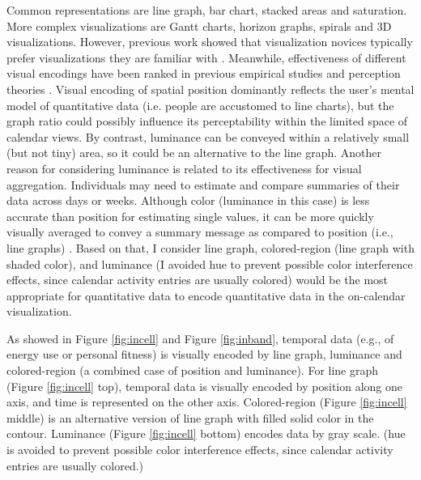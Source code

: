 \documentclass[12pt,oneside]{book}
\begin{document}
Common representations are line graph, bar chart, stacked areas and saturation.  More complex visualizations are Gantt charts, horizon graphs, spirals and 3D visualizations.  However, previous work showed that visualization novices typically prefer visualizations they are familiar with \cite{grammel_how_2010}.  Meanwhile, effectiveness of different visual encodings have been ranked in previous empirical studies and perception theories \cite{mackinlay_automating_1986}. 
Visual encoding of spatial position dominantly reflects the user's mental model of quantitative data (i.e. people are accustomed to line charts), but the graph ratio could possibly influence its perceptability within the limited space of calendar views.  By contrast, luminance can be conveyed within a relatively small (but not tiny) area, so it could be an alternative to the line graph.  Another reason for considering luminance is related to its effectiveness for visual aggregation.  Individuals may need to estimate and compare summaries of their data across days or weeks.  Although color (luminance in this case) is less accurate than position for estimating single values, it can be more quickly visually averaged to convey a summary message as compared to position (i.e., line graphs) \cite{correll_comparing_2012}.  Based on that, I consider line graph, colored-region (line graph with shaded color), and luminance (I avoided hue to prevent possible color interference effects, since calendar activity entries are usually colored) would be the most appropriate for quantitative data to encode quantitative data in the on-calendar visualization. 

As showed in Figure \ref{fig:incell} and Figure \ref{fig:inband}, temporal data (e.g., of energy use or personal fitness) is visually encoded by line graph, luminance and colored-region (a combined case of position and luminance).
For line graph (Figure \ref{fig:incell} top), temporal data is visually encoded by position along one axis, and time is represented on the other axis. Colored-region (Figure \ref{fig:incell} middle) is an alternative version of line graph with filled solid color in the contour. Luminance (Figure \ref{fig:incell} bottom) encodes data by gray scale. (hue is avoided to prevent possible color interference effects, since calendar activity entries are usually colored.) 
\end{document}
